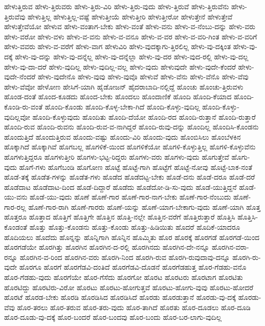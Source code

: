 {ಹೇಳುತ್ತಿರುವ
ಹೇಳು-ತ್ತಿರುವರು
ಹೇಳು-ತ್ತಿರು-ವಿರಿ
ಹೇಳು-ತ್ತಿರು-ವುದು
ಹೇಳು-ತ್ತಿರುವೆ
ಹೇಳು-ತ್ತಿರುವೆನು
ಹೇಳು-ತ್ತಿರುವೆವು
ಹೇಳುತ್ತಿಲ್ಲ
ಹೇಳುತ್ತಿಲ್ಲ-ವಷ್ಟೆ
ಹೇಳುತ್ತೀಯೆ
ಹೇಳುತ್ತೀರಿ
ಹೇಳುತ್ತೀರೋ
ಹೇಳುತ್ತೇನೆ
ಹೇಳುತ್ತೇವೆ
ಹೇಳುತ್ತೇವೆಯೋ
ಹೇಳುವ
ಹೇಳು-ವಂತಾಗ-ಬೇಕು
ಹೇಳು-ವಂತೆ
ಹೇಳು-ವನು
ಹೇಳು-ವ-ನೆಂಬು-ದನ್ನು
ಹೇಳು-ವರು
ಹೇಳು-ವರೋ
ಹೇಳು-ವಳು
ಹೇಳು-ವ-ವನು
ಹೇಳು-ವ-ವನೂ
ಹೇಳು-ವ-ವರ
ಹೇಳು-ವ-ವರಿ-ಗಿಂತ
ಹೇಳು-ವ-ವರಿಗೆ
ಹೇಳು-ವವರು
ಹೇಳು-ವ-ವರೆಗೆ
ಹೇಳು-ವಾಗ
ಹೇಳುವಿರಿ
ಹೇಳು-ವುದಕ್ಕಾಗು-ತ್ತಿರಲಿಲ್ಲ
ಹೇಳು-ವು-ದಕ್ಕಿಂತ
ಹೇಳು-ವು-ದಕ್ಕೆ
ಹೇಳು-ವು-ದನ್ನು
ಹೇಳು-ವು-ದನ್ನೆಲ್ಲ
ಹೇಳು-ವು-ದನ್ನೆಲ್ಲಾ
ಹೇಳು-ವು-ದರ
ಹೇಳು-ವುದ-ರಲ್ಲಿ
ಹೇಳು-ವು-ದಲ್ಲ
ಹೇಳು-ವು-ದಾ-ದರೆ
ಹೇಳು-ವುದಿಲ್ಲ
ಹೇಳು-ವುದಿಲ್ಲ-ವಲ್ಲ
ಹೇಳು-ವುದು
ಹೇಳುವುದೇ
ಹೇಳು-ವುದೇ-ಕೆಂದರೆ
ಹೇಳು-ವುದೇ-ನೆಂದರೆ
ಹೇಳು-ವುದೇನೊ
ಹೇಳು-ವುವು
ಹೇಳು-ವುವೊ
ಹೇಳುವೆ
ಹೇಳು-ವೆನು
ಹೇಳು-ವೆನೊ
ಹೇಳು-ವೆವು
ಹೇಳು-ವೆವೋ
ಹೇಳೋಣ
ಹೇಸಿಗೆ-ಯಾಗಿ
ಹೈಡೋಜನ್
ಹೈದರಾಬಾದಿ-ನಲ್ಲಿದ್ದೆ
ಹೊಂಚು
ಹೊಂಚು-ತ್ತಿರುವಳು
ಹೊಂಡ-ದಂತೆ
ಹೊಂದ-ಕೂಡದು
ಹೊಂದ-ಬೇಕು
ಹೊಂದಲು
ಹೊಂದಾಣಿಕೆ
ಹೊಂದಿ
ಹೊಂದಿ-ಕೆಯಾದ
ಹೊಂದಿ-ಕೊಂಡಿ-ರು-ವಂತೆ
ಹೊಂದಿ-ಕೊಂಡು
ಹೊಂದಿ-ಕೊಳ್ಳ-ಬೇಕಾ-ಗಿದೆ
ಹೊಂದಿ-ಕೊಳ್ಳು-ವುದಿಲ್ಲ
ಹೊಂದಿ-ಕೊಳ್ಳು-ವುದಿಲ್ಲವೋ
ಹೊಂದಿ-ಕೊಳ್ಳುವುದು
ಹೊಂದಿತು
ಹೊಂದಿ-ದೆಯೋ
ಹೊಂದಿ-ರದ
ಹೊಂದಿ-ರುತ್ತಾನೆ
ಹೊಂದಿ-ರುತ್ತಾರೆ
ಹೊಂದಿ-ರುವ
ಹೊಂದಿ-ರುವನು
ಹೊಂದಿ-ರುವ-ವ-ನಾಗಿದ್ದರೆ
ಹೊಂದಿ-ರುವು-ದನ್ನು
ಹೊಂದಿಲ್ಲ
ಹೊಂದಿಸಿ-ಕೊಂಡನು
ಹೊಂದುತ್ತಿದೆ
ಹೊಂದುತ್ತಿರುವ
ಹೊಂದು-ವಷ್ಟು
ಹೊಂದು-ವಿರಿ
ಹೊಂದು-ವುದು
ಹೊಂಬಿಸಿಲು
ಹೊಂಬೆಳಕಿನ
ಹೊಕ್ಕಾಗಿದೆ
ಹೊಕ್ಕಾಗಿವೆ
ಹೊಗಬಲ್ಲ
ಹೊಗಳಿಕೆ-ಯಿಂದ
ಹೊಗಳಿಕೆಯೋ
ಹೊಗಳಿ-ಕೊಳ್ಳುತ್ತಿಲ್ಲ
ಹೊಗಳಿ-ಕೊಳ್ಳುವೆನು
ಹೊಗಳುತ್ತಿದ್ದರೂ
ಹೊಗಳುತ್ತೀರಿ
ಹೊಗಳು-ಭಟ್ಟ-ರಿದ್ದರು
ಹೊಗಳು-ವರು
ಹೊಗಳು-ವುದು
ಹೊಗುತ್ತೇವೆ
ಹೊಗು-ವುದು
ಹೊಗೆ-ಗಳು
ಹೊಗೆಬಂಡಿ
ಹೊಗೋಣ
ಹೊಟ್ಟೆ
ಹೊಟ್ಟೆ-ಗಾಗಿ
ಹೊಟ್ಟೆಗೆ
ಹೊಟ್ಟೆ-ನೋವು
ಹೊಟ್ಟೆ-ಬಾಕ-ನಂತೆ
ಹೊಡೆ-ತಕ್ಕೆ
ಹೊಡೆತ-ಗಳನ್ನು
ಹೊಡೆತ-ಗಳು
ಹೊಡೆದ
ಹೊಡೆದಟ್ಟ-ಬೇಕು
ಹೊಡೆ-ದನು
ಹೊಡೆ-ದರೂ
ಹೊಡೆ-ದರೆ
ಹೊಡೆದಾಟ
ಹೊಡೆದಾಟ-ದಿಂದ
ಹೊಡೆ-ದಿದ್ದಾರೆ
ಹೊಡೆದು
ಹೊಡೆದೋ-ಡಿ-ಸು-ವುದು
ಹೊಡೆ-ಯುತ್ತಿದ್ದನೆ
ಹೊಡೆ-ಯು-ವನು
ಹೊಡೆ-ಯು-ವುದು
ಹೊಣೆ
ಹೊಣೆ-ಗಾರ
ಹೊಣೆ-ಗಾರ-ನಾಗ-ಬೇಕು
ಹೊಣೆ-ಗಾರ-ನೆಂಬುದು
ಹೊಣೆ-ಗಾರ-ರಲ್ಲ
ಹೊಣೆ-ಗಾರ-ರಾಗಿ
ಹೊಣೆ-ಗಾರರು
ಹೊಣೆ-ಯನ್ನು
ಹೊಣೆ-ಯಾಗ-ಬೇಕಾಗು-ವುದು
ಹೊಣೆ-ಯಾಗಿ
ಹೊತ್ತ
ಹೊತ್ತರೂ
ಹೊತ್ತಾದ
ಹೊತ್ತಿಗೆ
ಹೊತ್ತಿಗೇ
ಹೊತ್ತಿನ
ಹೊತ್ತಿ-ನಲ್ಲೇ
ಹೊತ್ತಿನ-ವರೆಗೆ
ಹೊತ್ತಿರುತ್ತಾರೆ
ಹೊತ್ತಿಸಿ
ಹೊತ್ತಿಸಿ-ಕೊಂಡಂತೆ
ಹೊತ್ತು
ಹೊತ್ತು-ಕೊಂಡನು
ಹೊತ್ತು-ಕೊಂಡು
ಹೊತ್ತು-ಹಿಡಿಯಿತು
ಹೊದರೆ
ಹೊದಿಕೆ-ಯಾದರೂ
ಹೊದಿಯಲು
ಹೊದೆದು
ಹೊನ್ನನ್ನು
ಹೊನ್ನಿಗಾಗಿ
ಹೊನ್ನಿನ
ಹೊಮ್ಮಿತು
ಹೊರ
ಹೊರಕ್ಕೆ
ಹೊರಗಡೆ
ಹೊರಗಡೆ-ಯಿಂದ
ಹೊರಗಡೆಯೇ
ಹೊರಗಿತ್ತು
ಹೊರಗಿನ
ಹೊರಗಿನ-ದ-ರಲ್ಲಿ
ಹೊರಗಿನದು
ಹೊರಗಿನ-ದೇ-ನನ್ನೂ
ಹೊರಗಿನ-ವರಾ-ರನ್ನೂ
ಹೊರಗಿನ-ವ-ರಿಂದ
ಹೊರಗಿನ-ವರು
ಹೊರಗಿ-ನಿಂದ
ಹೊರಗಿ-ರುವ
ಹೊರಗಿ-ರುವುದಾವು-ದನ್ನೂ
ಹೊರಗಿ-ರು-ವುದೇ
ಹೊರಗೂ
ಹೊರಗೆ
ಹೊರಗೆಡವಿ-ದಂತಿದೆ
ಹೊರಗೆಡವಿ-ದೊಡನೆ
ಹೊರಗೆಡಹುತ್ತ
ಹೊರ-ಗೆಡಹು-ವನೊ
ಹೊರ-ಗೆಡಹು-ವುದು
ಹೊರಗೆಯೇ
ಹೊರ-ಗೆಸೆದು
ಹೊರಗೋ
ಹೊರಟ
ಹೊರಟರು
ಹೊರಟಾಗ
ಹೊರಟಿತು
ಹೊರಟಿದ್ದು
ಹೊರಟಿರು-ವಿರೋ
ಹೊರಟು
ಹೊರಟು-ಹೋಗುತ್ತವೆ
ಹೊರಟು-ಹೋಗು-ವುವು
ಹೊರಟು-ಹೋದರೆ
ಹೊರಟೆ
ಹೊರಡ-ಬೇಕು
ಹೊರಡಿ
ಹೊರಡಿಸಿದ
ಹೊರಡಿಸಿದೆ
ಹೊರಡು
ಹೊರಡುತ್ತಾನೆ
ಹೊರಡು-ವು-ದಕ್ಕೆ
ಹೊರಡು-ವೆವು
ಹೊರ-ತರಲು
ಹೊರ-ತರುವ
ಹೊರ-ತರು-ವುದು
ಹೊರ-ತಾಗಿದೆ
ಹೊರತು
ಹೊರ-ದೂಡಲು
ಹೊರ-ದೂಡಿ
ಹೊರ-ದೂಡು-ವು-ದಕ್ಕೆ
ಹೊರ-ಬಂದರೆ
ಹೊರ-ಬಂದವು
ಹೊರ-ಬಂದು
ಹೊರ-ಬರ-ಲಾಗು-ವುದಿಲ್ಲ
}

